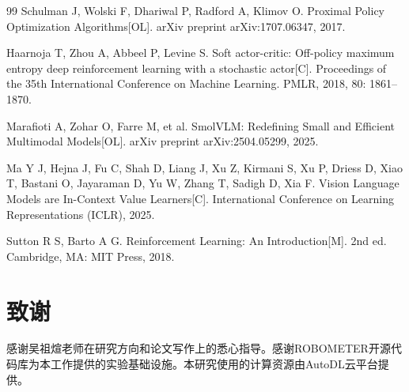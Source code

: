 \begin{thebibliography}{99}
Schulman J, Wolski F, Dhariwal P, Radford A, Klimov O.
Proximal Policy Optimization Algorithms[OL].
arXiv preprint arXiv:1707.06347, 2017.

Haarnoja T, Zhou A, Abbeel P, Levine S.
Soft actor-critic: Off-policy maximum entropy deep reinforcement learning with a stochastic actor[C].
Proceedings of the 35th International Conference on Machine Learning. PMLR, 2018, 80: 1861--1870.

Marafioti A, Zohar O, Farre M, et al.
SmolVLM: Redefining Small and Efficient Multimodal Models[OL].
arXiv preprint arXiv:2504.05299, 2025.

Ma Y J, Hejna J, Fu C, Shah D, Liang J, Xu Z, Kirmani S, Xu P, Driess D, Xiao T, Bastani O, Jayaraman D, Yu W, Zhang T, Sadigh D, Xia F.
Vision Language Models are In-Context Value Learners[C].
International Conference on Learning Representations (ICLR), 2025.

Sutton R S, Barto A G.
Reinforcement Learning: An Introduction[M].
2nd ed. Cambridge, MA: MIT Press, 2018.


\end{thebibliography}



\clearpage
\section*{致谢}

感谢吴祖煊老师在研究方向和论文写作上的悉心指导。感谢ROBOMETER\cite{robometer2026}开源代码库为本工作提供的实验基础设施。本研究使用的计算资源由AutoDL云平台提供。



